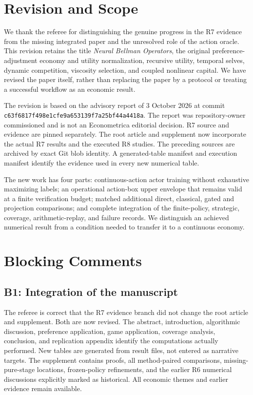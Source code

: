 \section{Revision and Scope}
We thank the referee for distinguishing the genuine progress in the R7 evidence from the missing integrated paper and the unresolved role of the action oracle. This revision retains the title \emph{Neural Bellman Operators}, the original preference-adjustment economy and utility normalization, recursive utility, temporal selves, dynamic competition, viscosity selection, and coupled nonlinear capital. We have revised the paper itself, rather than replacing the paper by a protocol or treating a successful workflow as an economic result.

The revision is based on the advisory report of 3 October 2026 at commit \texttt{c63f6817f498e1cfe9a653139f7a25bf44a4418a}. The report was repository-owner commissioned and is not an Econometrica editorial decision. R7 source and evidence are pinned separately. The root article and supplement now incorporate the actual R7 results and the executed R8 studies. The preceding sources are archived by exact Git blob identity. A generated-table manifest and execution manifest identify the evidence used in every new numerical table.

The new work has four parts: continuous-action actor training without exhaustive maximizing labels; an operational action-box upper envelope that remains valid at a finite verification budget; matched additional direct, classical, gated and projection comparisons; and complete integration of the finite-policy, strategic, coverage, arithmetic-replay, and failure records. We distinguish an achieved numerical result from a condition needed to transfer it to a continuous economy.

\section{Blocking Comments}
\subsection{B1: Integration of the manuscript}
The referee is correct that the R7 evidence branch did not change the root article and supplement. Both are now revised. The abstract, introduction, algorithmic discussion, preference application, game application, coverage analysis, conclusion, and replication appendix identify the computations actually performed. New tables are generated from result files, not entered as narrative targets. The supplement contains proofs, all method-paired comparisons, missing-pure-stage locations, frozen-policy refinements, and the earlier R6 numerical discussions explicitly marked as historical. All economic themes and earlier evidence remain available.

